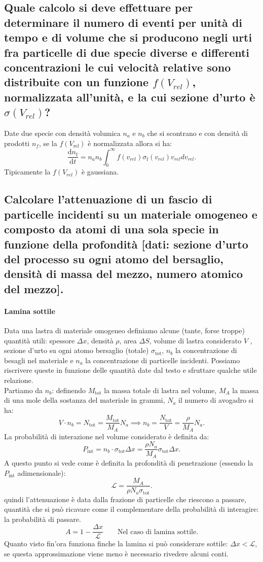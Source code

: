 \subsection[]{  Quale calcolo si deve effettuare per determinare il numero di eventi per unità di tempo e di volume che si producono negli urti fra particelle di due specie diverse e differenti concentrazioni le cui velocità relative sono distribuite con un funzione $f(V_{rel})$, normalizzata all'unità, e la cui sezione d'urto è $\sigma(V_{rel})$?}
Date due specie con densità volumica $n_a$ e  $n_b$ che si scontrano e con densità di prodotti $n_f$, se la $ f\left( V_{\text{rel}} \right) $ è normalizzata allora si ha:
\[
	\frac{\mbox{d} n_{\text{f}}}{\mbox{d} t } = n_a n_b \int_0^{\infty} f\left( v_{rel} \right) \sigma_{\text{f}}\left( v_{rel} \right) v_{rel} dv_{rel}
.\] 
Tipicamente la $f\left( V_{rel} \right)$ è gaussiana. 

\subsection[]{ Calcolare l'attenuazione di un fascio di particelle incidenti su un materiale omogeneo e composto da atomi di una sola specie in funzione della profondità [dati: sezione d'urto del processo su ogni atomo del bersaglio, densità di massa del mezzo, numero atomico del mezzo].}
\label{sec:2.b.5}
\paragraph{Lamina sottile}
Data una lastra di materiale omogeneo definiamo alcune (tante, forse troppe) quantità utili: spessore $\Delta x$, densità $\rho$, area $\Delta S$, volume di lastra considerato $V$ , sezione d'urto su ogni atomo bersaglio (totale) $ \sigma_{\text{tot}}$, $n_b$ la concentrazione di besagli nel materiale e $n_a$ la concentrazione di particelle incidenti. Possiamo riscrivere queste in funzione delle quantità date dal testo e sfruttare qualche utile relazione.\\ 
Partiamo da $n_b$: definendo $M_{\text{tot}}$ la massa totale di lastra nel volume, $M_A$ la massa di una mole della sostanza del materiale in grammi, $N_a$ il numero di avogadro si ha:
\[
	V \cdot n_b = N_{\text{tot}} = \frac{M_{\text{tot}}}{M_A} N_a \implies n_b =\frac{N_{\text{tot}}}{V} = \frac{\rho}{M_A} N_a
.\]
La probabilità di interazione nel volume considerato è definita da:
\[
	P_{\text{int}} = n_b \cdot \sigma_{\text{tot}} \Delta x  = \frac{\rho N_a }{M_A} \sigma_{\text{tot}}\Delta x
.\] 
A questo punto si vede come è definita la profondità di penetrazione (essendo la $P_{\text{int}}$ adimensionale):
\[
	\mathcal{L} = \frac{M_A}{\rho N_a\sigma_{\text{tot}}}
.\] 
quindi l'attenuazione è data dalla frazione di particelle che riescono a passare, quantità che si può ricavare come il complementare della probabilità di interagire: la probabilità di passare.
\[
	A = 1 - \frac{\Delta x}{\mathcal{L}} \quad \quad 
	\text{Nel caso di lamina sottile}
.\] 
Quanto visto fin'ora funziona finche la lamina si può considerare sottile: $\Delta x < \mathcal{L}$, se questa approssimazione viene meno è necessario rivedere alcuni conti.
